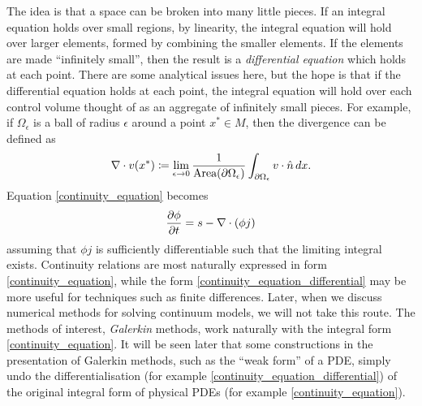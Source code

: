 The idea is that a space can be broken into many little pieces. If an integral equation holds over small regions, by linearity,
the integral equation will hold over larger elements, formed by combining the smaller elements.
If the elements are made ``infinitely small'',
then the result is a \textit{differential equation} which holds at each point. There are some analytical issues here, but
the hope is that if the differential equation holds at each point, the integral equation will hold over each control volume thought of
as an aggregate of infinitely small pieces.
For example, if $\Omega_\epsilon$ is a ball of radius $\epsilon$ around
a point $x^* \in M$, then the divergence can be defined as
\begin{equation}
    \nabla\cdot v (x^*) \coloneqq \lim_{\epsilon \rightarrow 0} \frac{1}{\text{Area}({\partial\Omega}_\epsilon)}\int_{{\partial\Omega}_\epsilon}v\cdot\hat{n}\,dx.
\end{equation}
% 
% 
Equation \eqref{continuity_equation} becomes
\begin{equation}\label{continuity_equation_differential}
    \frac{\partial \phi}{\partial t} = s - \nabla\cdot (\phi j)
\end{equation}
assuming that $\phi j$ is sufficiently differentiable such that the limiting integral exists.
Continuity relations are most naturally expressed in form \eqref{continuity_equation}, while the form
\eqref{continuity_equation_differential} may be more useful for techniques such as finite differences.
Later, when we discuss numerical methods for solving continuum models, we will not take this route. The methods of interest, \textit{Galerkin} methods,
work naturally with the integral form \eqref{continuity_equation}.
It will be seen later that some constructions in the presentation of Galerkin methods, such as the ``weak form'' of a PDE, simply undo the differentialisation
(for example \eqref{continuity_equation_differential}) of the original integral form of physical PDEs (for example \eqref{continuity_equation}).
